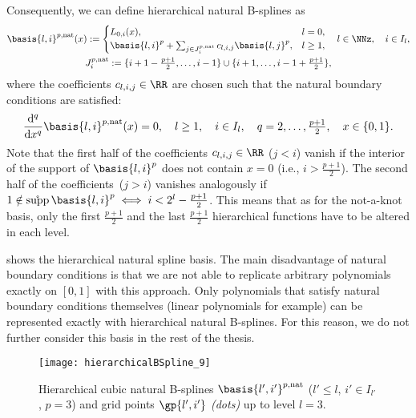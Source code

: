 %
Consequently, we can define hierarchical natural B-splines as
\begin{subequations}
  \begin{gather}
    \basis{l,i}^{p,\ntrl}(x)
    :=
    \begin{cases}
      L_{0,i}(x),&
      l = 0,\\
      \basis{l,i}^p +
      \sum_{j \in J_i^{p,\ntrl}} c_{l,i,j} \basis{l,j}^p,&
      l \ge 1,
    \end{cases}\quad
    l \in \NNz,\quad
    i \in I_l,\\
    J_i^{p,\ntrl}
    := \{i+1-\tfrac{p+1}{2}, \dotsc, i-1\} \cup
    \{i+1, \dotsc, i-1+\tfrac{p+1}{2}\},
  \end{gather}
\end{subequations}
where the coefficients $c_{l,i,j} \in \RR$ are chosen such that
the natural boundary conditions are satisfied:
\begin{equation}
  \frac{\diff^q}{\dx^q} \basis{l,i}^{p,\ntrl}(x)
  = 0,\quad
  l \ge 1,\quad
  i \in I_l,\quad
  q = 2, \dotsc, \tfrac{p+1}{2},\quad
  x \in \{0, 1\}.
\end{equation}
%
Note that the first half of the coefficients $c_{l,i,j} \in \RR$
($j < i$) vanish if the interior of the support of $\basis{l,i}^p$
does not contain $x = 0$
(i.e., $i > \tfrac{p+1}{2}$).
The second half of the coefficients~($j > i$) vanishes analogously
if $1 \notin \intsupp \basis{l,i}^p \iff i < 2^l - \tfrac{p+1}{2}$.
This means that as for the not-a-knot basis,
only the first $\tfrac{p+1}{2}$ and the last $\tfrac{p+1}{2}$
hierarchical functions have to be altered in each level.

 shows the hierarchical natural spline basis.
The main disadvantage of natural boundary conditions is that
we are not able to replicate arbitrary polynomials exactly on $[0, 1]$
with this approach.
Only polynomials that satisfy natural boundary conditions themselves
(linear polynomials for example)
can be represented exactly with hierarchical natural B-splines.
For this reason, we do not further consider this basis in the
rest of the thesis.

\begin{SCfigure}
  \texttt{[image: hierarchicalBSpline\_9]}%
  \caption{%
    Hierarchical cubic natural B-splines
    $\basis{l',i'}^{p,\ntrl}$
    ($l' \le l$, $i' \in I_{l'}$, $p = 3$) and
    grid points $\gp{l',i'}$ \emph{(dots)} up to level $l = 3$.%
  }%
  \label{fig:naturalBSpline}%
\end{SCfigure}
